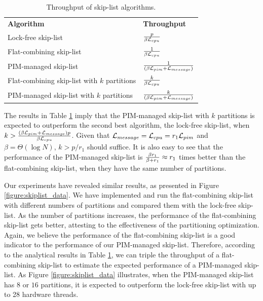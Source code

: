 \begin{table}[ht!]
\begin{center}
	\begin{tabular}{| >{\small}l | l |}
    \hline
    \textbf{Algorithm} & \textbf{Throughput} \\ \hhline{|=|=|} 
    Lock-free skip-list & ${p \over \beta\mathcal{L}_{cpu}}$ \\ \hline
    Flat-combining skip-list & ${1 \over \beta\mathcal{L}_{cpu}}$ \\ \hline
    PIM-managed skip-list & ${1 \over (\beta\mathcal{L}_{pim} + \mathcal{L}_{message})}$ \\ \hline
    Flat-combining skip-list with $k$ partitions & ${k \over \beta\mathcal{L}_{cpu}}$ \\ \hline
    PIM-managed skip-list with $k$ partitions & ${k \over (\beta\mathcal{L}_{pim} + \mathcal{L}_{message})}$ \\ \hline
    \end{tabular}
\end{center}
\caption{Throughput of skip-list algorithms.}
\label{tab:skiplist}
\end{table}

The results in Table \ref{tab:skiplist} imply that 
the PIM-managed skip-list with $k$ partitions is expected to outperform the second best algorithm, 
the lock-free skip-list, when $k > {(\beta\mathcal{L}_{pim} + \mathcal{L}_{message})p \over \beta\mathcal{L}_{cpu}}$.
Given that $\mathcal{L}_{message} = \mathcal{L}_{cpu} = r_1\mathcal{L}_{pim}$ and $\beta = \Theta(\log N)$, $k > p/r_1$ should suffice.
It is also easy to see that the performance of the PIM-managed skip-list is  
${\beta r_1 \over \beta + r_1} \approx r_1$ times better than the flat-combining skip-list, 
when they have the same number of partitions. 

Our experiments have revealed similar results, 
as presented in Figure \ref{figure:skiplist_data}.
We have implemented and run the flat-combining skip-list with different numbers of
partitions and compared them with the lock-free skip-list.
As the number of partitions increases, the performance of the flat-combining skip-list
gets better, attesting to the effectiveness of the partitioning optimization.
Again, we believe the performance of the flat-combining skip-list is a good indicator
to the performance of our PIM-managed skip-list.
Therefore, according to the analytical results in Table \ref{tab:skiplist}, we can triple the throughput 
of a flat-combining skip-list to estimate the expected performance of a PIM-managed skip-list.
As Figure \ref{figure:skiplist_data} illustrates, when the PIM-managed skip-list has $8$ or $16$ 
partitions, it is expected to outperform the lock-free skip-list with up to 28 hardware threads.

